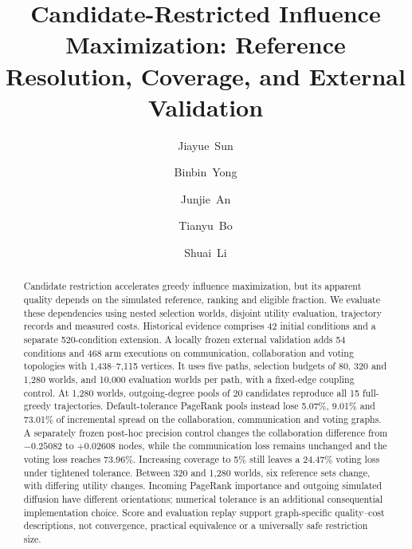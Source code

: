 \documentclass[smallextended]{svjour3}
\begin{document}
\title{Candidate-Restricted Influence Maximization: Reference Resolution, Coverage, and External Validation}
\author{\mbox{Jiayue Sun} \and \mbox{Binbin Yong} \and \mbox{Junjie An} \and \mbox{Tianyu Bo} \and \mbox{Shuai Li}}
\date{}
\maketitle
\begin{abstract}
Candidate restriction accelerates greedy influence maximization, but its apparent quality depends on the simulated reference, ranking and eligible fraction. We evaluate these dependencies using nested selection worlds, disjoint utility evaluation, trajectory records and measured costs. Historical evidence comprises 42 initial conditions and a separate 520-condition extension. A locally frozen external validation adds 54 conditions and 468 arm executions on communication, collaboration and voting topologies with 1,438--7,115 vertices. It uses five paths, selection budgets of 80, 320 and 1,280 worlds, and 10,000 evaluation worlds per path, with a fixed-edge coupling control. At 1,280 worlds, outgoing-degree pools of 20 candidates reproduce all 15 full-greedy trajectories. Default-tolerance PageRank pools instead lose 5.07\%, 9.01\% and 73.01\% of incremental spread on the collaboration, communication and voting graphs. A separately frozen post-hoc precision control changes the collaboration difference from $-0.25082$ to $+0.02608$ nodes, while the communication loss remains unchanged and the voting loss reaches 73.96\%. Increasing coverage to 5\% still leaves a 24.47\% voting loss under tightened tolerance. Between 320 and 1,280 worlds, six reference sets change, with differing utility changes. Incoming PageRank importance and outgoing simulated diffusion have different orientations; numerical tolerance is an additional consequential implementation choice. Score and evaluation replay support graph-specific quality--cost descriptions, not convergence, practical equivalence or a universally safe restriction size.
\end{abstract}
\end{document}
